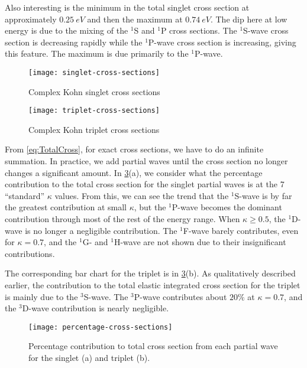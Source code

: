 \documentclass[Dissertation.tex]{subfiles}
\begin{document}
Also interesting is the minimum in the total singlet cross section at 
approximately $\SI{0.25}{eV}$ and then the maximum at $\SI{0.74}{eV}$. The dip
here at low energy is due to the mixing of the $^1$S and $^1$P cross sections.
The $^1$S-wave cross section is decreasing rapidly while the $^1$P-wave cross
section is increasing, giving this feature. The maximum is due primarily to the
$^1$P-wave.



\begin{figure}[H]
	\centering
	\texttt{[image: singlet-cross-sections]}
	\caption{Complex Kohn singlet cross sections}
	\label{fig:singlet-cross-sections}
\end{figure}

\begin{figure}[H]
	\centering
	\texttt{[image: triplet-cross-sections]}
	\caption{Complex Kohn triplet cross sections}
	\label{fig:triplet-cross-sections}
\end{figure}

From \cref{eq:TotalCross}, for exact cross sections, we have to do an infinite
summation. In practice, we add partial waves until the cross section no longer
changes a significant amount. In \cref{fig:percentage-cross-sections}(a), we
consider what the percentage contribution to the total cross section for
the singlet partial waves is at the 7 ``standard'' $\kappa$ values. From this,
we can see the trend that the $^1$S-wave is by far the greatest contribution at
small $\kappa$, but the $^1$P-wave becomes the dominant contribution through
most of the rest of the energy range. When $\kappa \geq 0.5$, the $^1$D-wave is
no longer a negligible contribution. The $^1$F-wave barely contributes, even
for $\kappa = 0.7$, and the $^1$G- and $^1$H-wave are not shown due to their
insignificant contributions.

The corresponding bar chart for the triplet is in
\cref{fig:percentage-cross-sections}(b). As qualitatively described earlier,
the contribution to the total elastic integrated cross section for
the triplet is mainly due to the $^3$S-wave. The $^3$P-wave contributes about
$20\%$ at $\kappa = 0.7$, and the $^3$D-wave contribution is nearly negligible.

\begin{figure}[H]
	\centering
	\texttt{[image: percentage-cross-sections]}
	\caption[Percentage contribution to total cross section]{Percentage contribution to total cross section from each partial wave for the singlet (a) and triplet (b).}
	\label{fig:percentage-cross-sections}
\end{figure}
\end{document}
